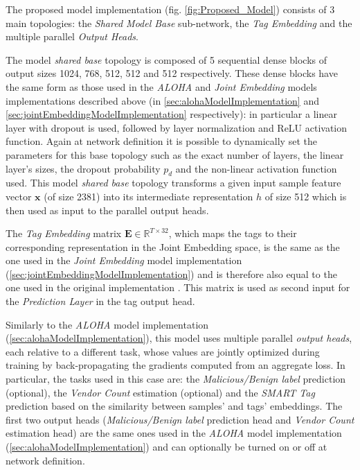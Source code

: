 \documentclass[pdfa%
,cucitura%
]{toptesi}
\begin{document}
The proposed model implementation (fig. \ref{fig:Proposed_Model}) consists of 3 main topologies: the \textit{Shared Model Base} sub-network, the \textit{Tag Embedding} and the multiple parallel \textit{Output Heads}.

The model \textit{shared base} topology is composed of 5 sequential dense blocks of output sizes 1024, 768, 512, 512 and 512 respectively. These dense blocks have the same form as those used in the \textit{ALOHA} and \textit{Joint Embedding} models implementations described above (in \ref{sec:alohaModelImplementation} and \ref{sec:jointEmbeddingModelImplementation} respectively): in particular a linear layer with dropout is used, followed by layer normalization and ReLU activation function. Again at network definition it is possible to dynamically set the parameters for this base topology such as the exact number of layers, the linear layer's sizes, the dropout probability $p_d$ and the non-linear activation function used. This model \textit{shared base} topology transforms a given input sample feature vector $\textbf{x}$ (of size 2381) into its intermediate representation $h$ of size 512 which is then used as input to the parallel output heads.

The \textit{Tag Embedding} matrix $\textbf{E} \in \mathbb{R}^{T \times 32}$, which maps the tags to their corresponding representation in the Joint Embedding space, is the same as the one used in the \textit{Joint Embedding} model implementation (\ref{sec:jointEmbeddingModelImplementation}) and is therefore also equal to the one used in the original implementation \cite{DucauAMDATSE}. This matrix is used as second input for the \textit{Prediction Layer} in the tag output head.

Similarly to the \textit{ALOHA} model implementation (\ref{sec:alohaModelImplementation}), this model uses multiple parallel \textit{output heads}, each relative to a different task, whose values are jointly optimized during training by back-propagating the gradients computed from an aggregate loss. In particular, the tasks used in this case are: the \textit{Malicious/Benign label} prediction (optional), the \textit{Vendor Count} estimation (optional) and the \textit{SMART Tag} prediction based on the similarity between samples' and tags' embeddings. The first two output heads (\textit{Malicious/Benign label} prediction head and \textit{Vendor Count} estimation head) are the same ones used in the \textit{ALOHA} model implementation (\ref{sec:alohaModelImplementation}) and can optionally be turned on or off at network definition.
\end{document}
